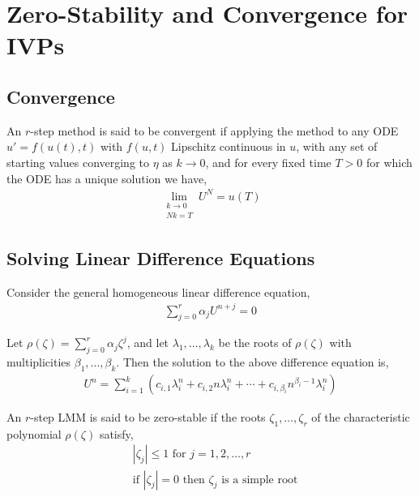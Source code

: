 \documentclass[12pt]{article}
\begin{document}
\section{Zero-Stability and Convergence for IVPs}

\subsection{Convergence}

\begin{definition}
    An \( r \)-step method is said to be convergent if applying the method to any ODE \( u' = f(u(t),t) \) with \( f(u,t) \) Lipschitz continuous in \( u \), with any set of starting values converging to \( \eta \) as \( k\to 0 \), and for every fixed time \( T>0 \) for which the ODE has a unique solution we have,
\begin{align*}
    \lim_{\substack{k\to 0\\Nk = T}} U^N =  u(T)
\end{align*}
    
\end{definition}

\subsection{Solving Linear Difference Equations}
Consider the general homogeneous linear difference equation,
\begin{align*}
    \sum_{j=0}^{r} \alpha_j U^{n+j} = 0
\end{align*}

Let \( \rho(\zeta) = \sum_{j=0}^{r} \alpha_j \zeta^j \), and let \( \lambda_1, \ldots, \lambda_{k} \) be the roots of \( \rho(\zeta) \) with multiplicities \( \beta_1, \ldots, \beta_k \). Then the solution to the above difference equation is,
\begin{align*}
    U^n =  \sum_{i=1}^{k} \left (c_{i,1} \lambda_i^n + c_{i,2} n \lambda_i^n + \cdots + c_{i,\beta_i} n^{\beta_i-1}\lambda_i^n\right)
\end{align*}

\begin{definition}
An \( r \)-step LMM is said to be zero-stable if the roots \( \zeta_1, \ldots, \zeta_r \) of the characteristic polynomial \( \rho(\zeta) \) satisfy,
\begin{align*}
    &|\zeta_j| \leq 1 \text{ for } j=1,2,\ldots, r \\
    &\text{if }|\zeta_j| = 0 \text{ then } \zeta_j \text{ is a simple root}
\end{align*}
\end{definition}
\end{document}
